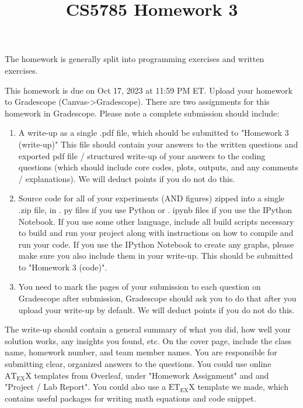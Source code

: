 \documentclass[10pt]{article}
\title{CS5785 Homework 3 }
\author{}
\date{}
\begin{document}
\maketitle
The homework is generally split into programming exercises and written exercises.

This homework is due on Oct 17, 2023 at 11:59 PM ET. Upload your homework to Gradescope (Canvas->Gradescope). There are two assignments for this homework in Gradescope. Please note a complete submission should include:

\begin{enumerate}
  \item A write-up as a single .pdf file, which should be submitted to "Homework 3 (write-up)" This file should contain your answers to the written questions and exported pdf file / structured write-up of your answers to the coding questions (which should include core codes, plots, outputs, and any comments / explanations). We will deduct points if you do not do this.

  \item Source code for all of your experiments (AND figures) zipped into a single .zip file, in . py files if you use Python or . ipynb files if you use the IPython Notebook. If you use some other language, include all build scripts necessary to build and run your project along with instructions on how to compile and run your code. If you use the IPython Notebook to create any graphs, please make sure you also include them in your write-up. This should be submitted to "Homework 3 (code)".

  \item You need to mark the pages of your submission to each question on Gradescope after submission, Gradescope should ask you to do that after you upload your write-up by default. We will deduct points if you do not do this.

\end{enumerate}

The write-up should contain a general summary of what you did, how well your solution works, any insights you found, etc. On the cover page, include the class name, homework number, and team member names. You are responsible for submitting clear, organized answers to the questions. You could use online $\mathrm{AT}_{\mathrm{EX}} \mathrm{X}$ templates from Overleaf, under "Homework Assignment" and and "Project / Lab Report". You could also use a $\mathrm{ET}_{\mathrm{EX}} \mathrm{X}$ template we made, which contains useful packages for writing math equations and code snippet.
\end{document}
